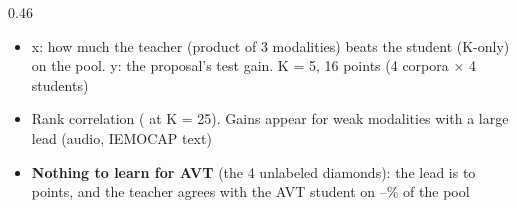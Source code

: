 \begin{frame}{}
\begin{columns}[T]
\begin{column}{0.46\textwidth}
{\begin{itemize}
\end{itemize}
}{%
\begin{itemize}
\item x: how much the teacher (product of 3 modalities) beats the student (K-only) on the pool. y: the proposal's test gain. K = 5, 16 points (4 corpora × 4 students)
\item Rank correlation  ( at K = 25). Gains appear for weak modalities with a large lead (audio, IEMOCAP text)
\item \textbf{Nothing to learn for AVT} (the 4 unlabeled diamonds): the lead is  to  points, and the teacher agrees with the AVT student on --\% of the pool
\end{itemize}
}
\end{column}
\end{columns}
{\tiny\color{mMuted}}
\end{frame}

